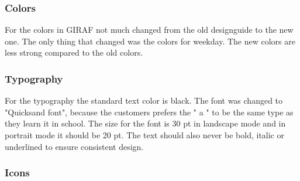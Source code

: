 \subsubsection{Colors}
For the colors in GIRAF not much changed from the old designguide to the new one. 
The only thing that changed was the colors for weekday.
The new colors are less strong compared to the old colors.

\subsubsection{Typography}
For the typography the standard text color is black. The font was changed to "Quicksand font", because the customers prefers the " a " to be the same type as they learn it in school.
The size for the font is 30 pt in landscape mode and in portrait mode it should be 20 pt.
The text should also never be bold, italic or underlined to ensure consistent design.

\subsubsection{Icons}


